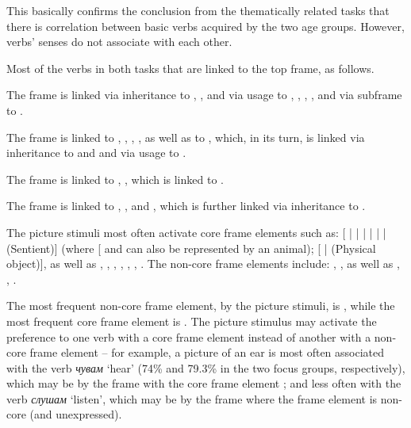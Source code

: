 \documentclass[output=paper,colorlinks,citecolor=brown]{langscibook}
\begin{document}
This basically confirms the conclusion from the thematically related tasks that there is correlation between basic verbs acquired by the two age groups. However, verbs' senses do not associate with each other. 

Most of the verbs in both tasks  that are linked to the  top frame, as follows. 

The frame  is linked via inheritance to , , and  via usage to , , , , and via subframe to . 

The frame  is linked to , , , , as well as to , which, in its turn, is linked via inheritance to  and  and via usage to . 

The frame  is linked to , , which is linked to .

The frame  is linked to , , and , which is further linked via inheritance to . 

The picture stimuli most often activate core frame elements such as: [ |  |  |  |  |  |  (Sentient)] (where [ and  can also be represen\-ted by an animal); [ |  (Physical object)], as well as , , , , , , . The non-core frame elements include: , , as well as , , . 

The most frequent non-core frame element,  by the picture stimuli, is , while the most frequent core frame element is . The picture stimulus may activate the preference to one verb with a core frame element instead of another with a non-core frame element -- for example, a picture of an ear is most often associated with the verb \textit{чувам} `hear' (74\% and 79.3\% in the two focus groups, respectively), which may be  by the frame  with the core frame element ; and less often with the verb \textit{слушам} `listen', which may be  by the frame  where the  frame element is non-core (and unexpressed).
\end{document}
